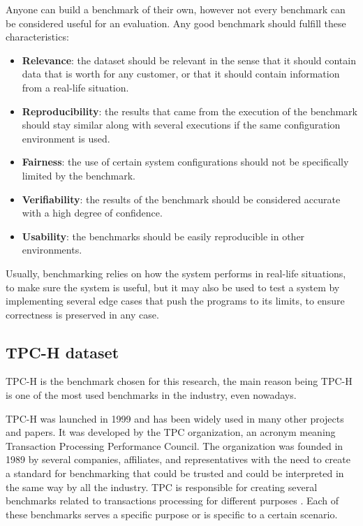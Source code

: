 \documentclass[conference]{IEEEtran}
\begin{document}
Anyone can build a benchmark of their own, however not every benchmark can be considered useful for an evaluation. Any good benchmark should fulfill these characteristics:
\begin{itemize}
    \item \textbf{Relevance}: the dataset should be relevant in the sense that it should contain data that is worth for any customer, or that it should contain information from a real-life situation.
    \item \textbf{Reproducibility}: the results that came from the execution of the benchmark should stay similar along with several executions if the same configuration environment is used.
    \item \textbf{Fairness}: the use of certain system configurations should not be specifically limited by the benchmark.
    \item \textbf{Verifiability}: the results of the benchmark should be considered accurate with a high degree of confidence.
    \item \textbf{Usability}: the benchmarks should be easily reproducible in other environments.
\end{itemize}

Usually, benchmarking relies on how the system performs in real-life situations, to make sure the system is useful, but it may also be used to test a system by implementing several edge cases that push the programs to its limits, to ensure correctness is preserved in any case.

\subsection{TPC-H dataset}
TPC-H is the benchmark chosen for this research, the main reason being TPC-H is one of the most used benchmarks in the industry, even nowadays.

TPC-H was launched in 1999 and has been widely used in many other projects and papers.
It was developed by the TPC organization, an acronym meaning Transaction Processing Performance Council. The organization was founded in 1989 by several companies, affiliates, and representatives with the need to create a standard for benchmarking that could be trusted and could be interpreted in the same way by all the industry.
TPC is responsible for creating several benchmarks related to transactions processing for different purposes \cite{shanley-1998}. Each of these benchmarks serves a specific purpose or is specific to a certain scenario.
\end{document}
